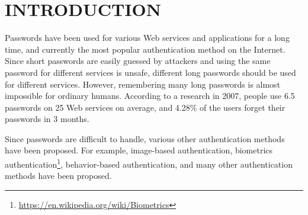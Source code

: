 \documentclass{sigchi}
\begin{document}
\section{INTRODUCTION}

% 

Passwords have been used for various Web services and applications
for a long time, and currently the most popular authentication method on the Internet.
%
Since short passwords are easily guessed by attackers and
using the same password for different services is unsafe,
different long passwords should be used for different services.
However,
remembering many long passwords is almost impossible for ordinary humans.
%
According to a research in 2007,
people use 6.5 passwords on 25 Web services on average, and
4.28\% of the users forget their passwords in 3 months\cite{Florencio:2007:LSW:1242572.1242661}.



%   

Since passwords are difficult to handle,
various other authentication methods have been proposed.
For example,
image-based authentication\cite{Biddle:2012:GPL:2333112.2333114}\cite{GraphicalPasswords}, 
biometrics authentication\footnote{
  \url{https://en.wikipedia.org/wiki/Biometrics}
},
behavior-based authentication\cite{Dandapat:2015:AYD:2702123.2702457}, 
and many other authentication methods have been proposed.

\end{document}

